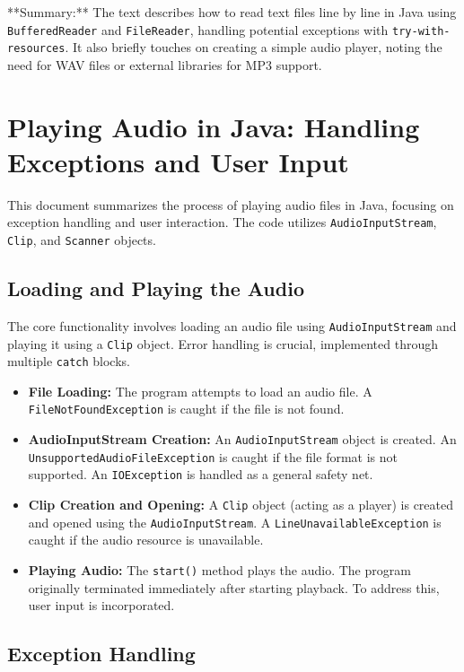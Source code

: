\documentclass{article}
\begin{document}
\begin{itemize}
**Summary:** The text describes how to read text files line by line in Java using \texttt{BufferedReader} and \texttt{FileReader}, handling potential exceptions with \texttt{try-with-resources}.  It also briefly touches on creating a simple audio player, noting the need for WAV files or external libraries for MP3 support.


\section{Playing Audio in Java: Handling Exceptions and User Input}

This document summarizes the process of playing audio files in Java, focusing on exception handling and user interaction.  The code utilizes \texttt{AudioInputStream}, \texttt{Clip}, and \texttt{Scanner} objects.

\subsection{Loading and Playing the Audio}

The core functionality involves loading an audio file using \texttt{AudioInputStream} and playing it using a \texttt{Clip} object.  Error handling is crucial, implemented through multiple \texttt{catch} blocks.

\begin{itemize}
    \item \textbf{File Loading:} The program attempts to load an audio file.  A \texttt{FileNotFoundException} is caught if the file is not found.
    \item \textbf{AudioInputStream Creation:} An \texttt{AudioInputStream} object is created.  An \texttt{UnsupportedAudioFileException} is caught if the file format is not supported. An \texttt{IOException} is handled as a general safety net.
    \item \textbf{Clip Creation and Opening:} A \texttt{Clip} object (acting as a player) is created and opened using the \texttt{AudioInputStream}.  A \texttt{LineUnavailableException} is caught if the audio resource is unavailable.
    \item \textbf{Playing Audio:} The \texttt{start()} method plays the audio.  The program originally terminated immediately after starting playback.  To address this, user input is incorporated.
\end{itemize}

\subsection{Exception Handling}


\end{itemize}
\end{document}
